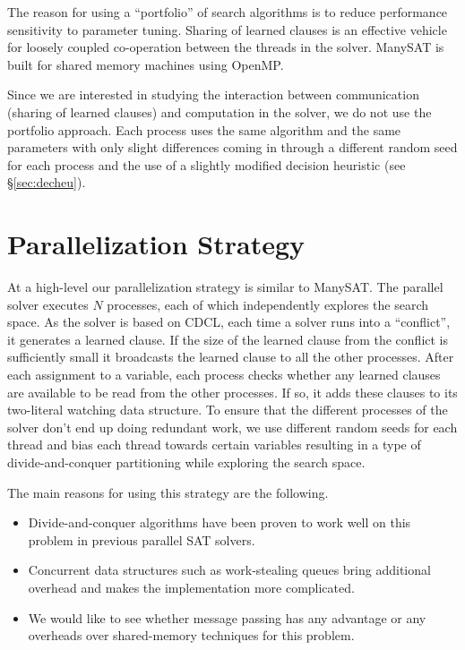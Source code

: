 \documentclass[letterpaper, compsoc, conference]{IEEEtran}
\begin{document}
The reason for using a ``portfolio'' of search algorithms is to reduce
performance sensitivity to parameter tuning. Sharing of learned clauses is an
effective vehicle for loosely coupled co-operation between the threads in the
solver. ManySAT is built for shared memory machines using OpenMP.

Since we are interested in studying the interaction between communication
(sharing of learned clauses) and computation in the solver, we do not use the
portfolio approach. Each process uses the same algorithm and the same
parameters with only slight differences coming in through a different random
seed for each process and the use of a slightly modified decision heuristic
(see \S\ref{sec:decheu}).

\section{Parallelization Strategy}
\label{sec:strategy}

At a high-level our parallelization strategy is similar to ManySAT. The
parallel solver executes $N$ processes, each of which independently explores
the search space. As the solver is based on CDCL, each time a solver runs into
a ``conflict'', it generates a learned clause. If the size of the learned
clause from the conflict is sufficiently small it broadcasts the learned clause
to all the other processes.  After each assignment to a variable, each process
checks whether any learned clauses are available to be read from the other
processes.  If so, it adds these clauses to its two-literal watching data
structure. To ensure that the different processes of the solver don't end up
doing redundant work, we use different random seeds for each thread and bias
each thread towards certain variables resulting in a type of divide-and-conquer
partitioning while exploring the search space.

The main reasons for using this strategy are the following.
\begin{itemize}
\item Divide-and-conquer algorithms have been proven to work well on this
problem in previous parallel SAT solvers.
\item Concurrent data structures such as work-stealing queues bring additional
overhead and makes the implementation more complicated.
\item We would like to see whether message passing has any advantage or
any overheads over shared-memory techniques for this problem.
\end{itemize} 
\end{document}
